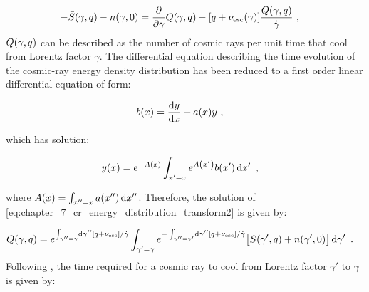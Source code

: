 \begin{equation}
    \begin{aligned}
        -\bar{S}\qty(\gamma,q)-n\qty(\gamma,0)&=\pdv{}{\gamma}Q\qty(\gamma,q)-\qty[q+\nu_\text{esc}\qty(\gamma)]\frac{Q\qty(\gamma,q)}{\dot{\gamma}}\text{ ,}
    \end{aligned}  \label{eq:chapter_7_cr_energy_distribution_transform2}
\end{equation}
\noindent $Q\qty(\gamma,q)$ can be described as the number of cosmic rays per unit time that cool from Lorentz factor $\gamma$. The differential equation describing the time evolution of the cosmic-ray energy density distribution has been reduced to a first order linear differential equation of form:

\begin{equation}
	\begin{aligned}
		b\qty(x)&=\dv{y}{x}+a\qty(x)y\text{ ,}
	\end{aligned}
\end{equation}

\noindent which has solution:

\begin{equation}
    \begin{aligned}
        y\qty(x)&=e^{-A\qty(x)}\int_{x'=x} e^{A\qty(x')}b\qty(x')\dd{x'}\text{ ,}
    \end{aligned}
\end{equation}

\noindent where $A\qty(x)=\int_{x''=x} a\qty(x'') \dd{x''}$. Therefore, the solution of \autoref{eq:chapter_7_cr_energy_distribution_transform2} is given by:

\begin{equation}
	\begin{aligned}
		Q\qty(\gamma,q)&=e^{\int_{\gamma''=\gamma}\dd{\gamma''}\qty[q+\nu_\text{esc}]/\dot{\gamma}}\int_{\gamma'=\gamma} e^{-\int_{\gamma''=\gamma'}\dd{\gamma''}\qty[q+\nu_\text{esc}]/\dot{\gamma}}\qty[\bar{S}\qty(\gamma',q)+n\qty(\gamma',0)]\dd{\gamma'}\text{ .}
	\end{aligned} \label{eq:07_solution_Q}
\end{equation}
\noindent Following \cite{1980gbs..bookR....M}, the time required for a cosmic ray to cool from Lorentz factor $\gamma'$ to $\gamma$ is given by:

